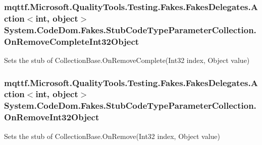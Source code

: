\hypertarget{class_system_1_1_code_dom_1_1_fakes_1_1_stub_code_type_parameter_collection_a183db87bd6ef098880ee53289771bbd2}{
\subsubsection[{On\-Remove\-Complete\-Int32\-Object}]{\setlength{\rightskip}{0pt plus 5cm}mqttf.\-Microsoft.\-Quality\-Tools.\-Testing.\-Fakes.\-Fakes\-Delegates.\-Action$<$int, object$>$ System.\-Code\-Dom.\-Fakes.\-Stub\-Code\-Type\-Parameter\-Collection.\-On\-Remove\-Complete\-Int32\-Object}}\label{class_system_1_1_code_dom_1_1_fakes_1_1_stub_code_type_parameter_collection_a183db87bd6ef098880ee53289771bbd2}


Sets the stub of Collection\-Base.\-On\-Remove\-Complete(\-Int32 index, Object value)

\hypertarget{class_system_1_1_code_dom_1_1_fakes_1_1_stub_code_type_parameter_collection_a95e69f2a9ebc4c77db41a71b71c469dc}{
\subsubsection[{On\-Remove\-Int32\-Object}]{\setlength{\rightskip}{0pt plus 5cm}mqttf.\-Microsoft.\-Quality\-Tools.\-Testing.\-Fakes.\-Fakes\-Delegates.\-Action$<$int, object$>$ System.\-Code\-Dom.\-Fakes.\-Stub\-Code\-Type\-Parameter\-Collection.\-On\-Remove\-Int32\-Object}}\label{class_system_1_1_code_dom_1_1_fakes_1_1_stub_code_type_parameter_collection_a95e69f2a9ebc4c77db41a71b71c469dc}


Sets the stub of Collection\-Base.\-On\-Remove(\-Int32 index, Object value)

